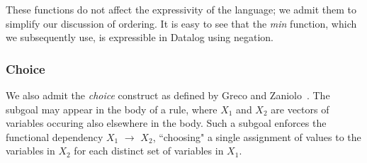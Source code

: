 \linebreak{}

These functions do not affect the expressivity of the language; we admit them
to simplify our discussion of ordering.  It is easy to see that the \emph{min} function,
which we subsequently use, is expressible in Datalog using negation.




  









\subsubsection{Choice}

We also admit the \emph{choice} construct as defined by Greco and Zaniolo~\cite{greedychoice}.
The subgoal  may appear in the body of a rule, where
\emph{$X_1$} and \emph{$X_2$} are vectors of variables occuring also elsewhere in the body.  Such a subgoal
enforces the functional dependency \emph{$X_1$} $\to$ $X_2$, ``choosing" a single assignment of values to the variables
in \emph{$X_2$} for each distinct set of variables in \emph{$X_1$}.

